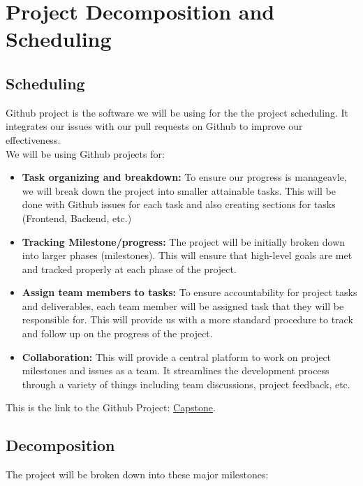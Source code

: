 \documentclass{article}
\begin{document}
\section{Project Decomposition and Scheduling}

\subsection{Scheduling}

Github project is the software we will be using for the the project scheduling.
It integrates our issues with our pull requests on Github to improve our effectiveness.\\
We will be using Github projects for:
\begin{itemize}
	\item \textbf{Task organizing and breakdown: } To ensure our progress is manageavle,
	we will break down the project into smaller attainable tasks. This will be done with
	Github issues for each task and also creating sections for tasks (Frontend, Backend, etc.)
	\item \textbf{Tracking Milestone/progress: } The project will be initially broken down into
	larger phases (milestones). This will ensure that high-level goals are met and tracked
	properly at each phase of the project.
	\item \textbf{Assign team members to tasks: } To ensure accountability for project tasks
	and deliverables, each team member will be assigned task that they will be responsible for.
	This will provide us with a more standard procedure to track and follow up on the
	progress of the project.
	\item \textbf{Collaboration: } This will provide a central platform to work on project
	milestones and issues as a team. It streamlines the development process through a variety
	of things including team discussions, project feedback, etc.
\end{itemize}

This is the link to the Github Project: \href{http://GitHub.com/users/dereklii/projects/2}{Capstone}.

\subsection{Decomposition}


The project will be broken down into these major milestones:
\end{document}
